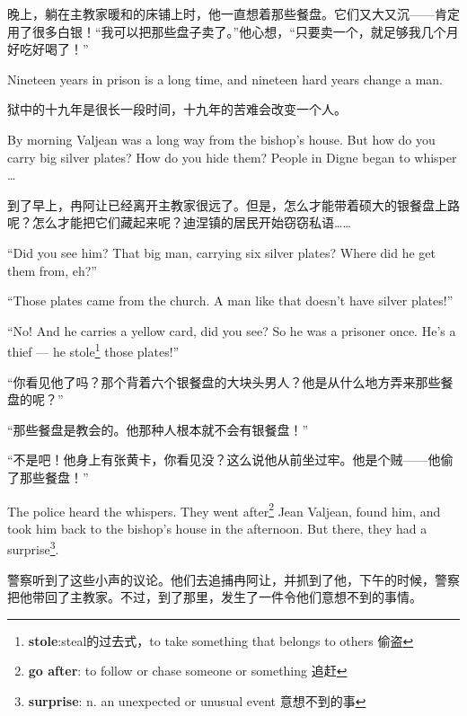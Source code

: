 \documentclass[fontset=ubuntu, zihao=5]{ctexart}
\begin{document}
\begin{paracol}{2}
  \switchcolumn

  晚上，躺在主教家暖和的床铺上时，他一直想着那些餐盘。它们又大又沉——肯定用了很多白银！“我可以把那些盘子卖了。”他心想，“只要卖一个，就足够我几个月好吃好喝了！”

  \switchcolumn*

  Nineteen years in prison is a long time, and nineteen hard years change a man.

  \switchcolumn

  狱中的十九年是很长一段时间，十九年的苦难会改变一个人。

  \switchcolumn*

  \sectionbreak

  By morning Valjean was a long way from the bishop's house. But how do you carry big silver plates? How do you hide them? People in Digne began to whisper \ldots{}

  \switchcolumn

  \sectionbreak
  到了早上，冉阿让已经离开主教家很远了。但是，怎么才能带着硕大的银餐盘上路呢？怎么才能把它们藏起来呢？迪涅镇的居民开始窃窃私语……


  \switchcolumn*

  ``Did you see him? That big man, carrying six silver plates? Where did he get them from, eh?''

  ``Those plates came from the church. A man like that doesn't have silver plates!''

  ``No! And he carries a yellow card, did you see? So he was a prisoner once.
  He's a thief --- he stole\footnote{\textbf{stole}:steal的过去式，to take
    something that belongs to others 偷盗} those plates!''

  \switchcolumn

  “你看见他了吗？那个背着六个银餐盘的大块头男人？他是从什么地方弄来那些餐盘的呢？”

  “那些餐盘是教会的。他那种人根本就不会有银餐盘！”

  “不是吧！他身上有张黄卡，你看见没？这么说他从前坐过牢。他是个贼——他偷了那些餐盘！”

  \switchcolumn*

  The police heard the whispers. They went after\footnote{\textbf{go after}: to follow or chase someone or something 追赶} Jean Valjean, found him, and took him back to the bishop's house in the afternoon. But there, they had a surprise\footnote{\textbf{surprise}: n. an unexpected or unusual event 意想不到的事}.

  \switchcolumn
  警察听到了这些小声的议论。他们去追捕冉阿让，并抓到了他，下午的时候，警察把他带回了主教家。不过，到了那里，发生了一件令他们意想不到的事情。


\end{paracol}
\end{document}
